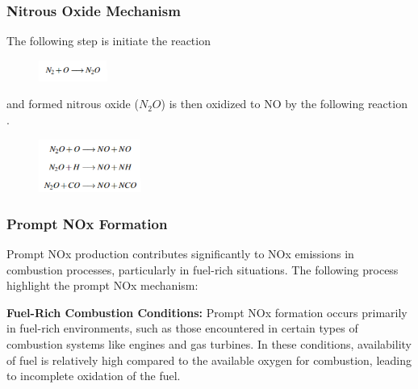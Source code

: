 \subsubsection{Nitrous Oxide Mechanism}
The following step is initiate the reaction

\begin{figure}[h]
	\centering
	\includegraphics[width=0.2\textwidth]{Chapter1/Images/reaction3.png}
\end{figure}
and formed nitrous oxide ($N_2 O$) is then oxidized to NO by the following reaction \cite{Lefebvre2009}.
\begin{figure}[h]
	\centering
	\includegraphics[width=0.3\textwidth]{Chapter1/Images/reaction2.png}
\end{figure}

\subsubsection{Prompt NOx Formation}
Prompt NOx production contributes significantly to NOx emissions in combustion processes, particularly in fuel-rich situations.
The following process highlight the prompt NOx mechanism:

\textbf{Fuel-Rich Combustion Conditions:}
Prompt NOx formation occurs primarily in fuel-rich environments, such as those encountered in certain types of combustion systems like engines and gas turbines. 
In these conditions, availability of fuel is relatively high compared to the available oxygen for combustion, leading to incomplete oxidation of the fuel.

